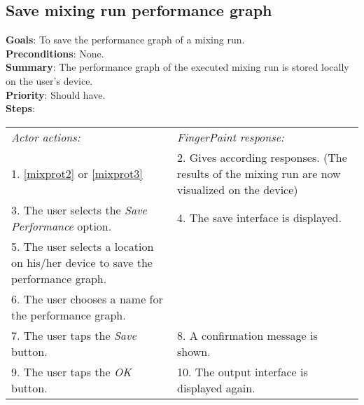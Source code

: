 \begin{appendices}
  \section{Save mixing run performance graph}
  \label{savemixgraph}
  \textbf{Goals}: To save the performance graph of a mixing run.\\
  \textbf{Preconditions}: None.\\
  \textbf{Summary}: The performance graph of the executed mixing run is stored locally on the user's device.\\
  \textbf{Priority}: Should have.\\
  \textbf{Steps}: \\
  \begin{tabular}{ p{} p{} }
  	\emph{Actor actions:} & \emph{FingerPaint response:} \\
  1. \ref{mixprot2} or \ref{mixprot3} & 2. Gives according responses. (The results of the mixing run are now visualized  on the device) \\  
	 3. The user selects the \emph{Save Performance} option. & 4. The save interface is displayed.\\
	 5. The user selects a location on his/her device to save the performance graph. & \\
	 6. The user chooses a name for the performance graph. & \\
	 7. The user taps the \emph{Save} button. & 8. A confirmation message is shown. \\
	 9. The user taps the \emph{OK} button. & 10. The output interface is displayed again. \\
  \end{tabular}


\end{appendices}
